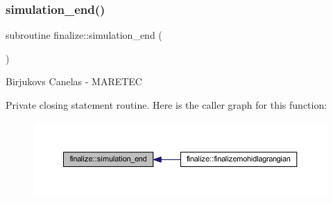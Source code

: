 \subsubsection{\texorpdfstring{simulation\+\_\+end()}{simulation\_end()}}
{\footnotesize\ttfamily subroutine finalize\+::simulation\+\_\+end (\begin{DoxyParamCaption}{ }\end{DoxyParamCaption})\hspace{0.3cm}{\ttfamily [private]}}



Birjukovs Canelas -\/ M\+A\+R\+E\+T\+EC 

Private closing statement routine. Here is the caller graph for this function\+:\nopagebreak
\begin{figure}[H]
\begin{center}
\leavevmode
\includegraphics[width=350pt]{namespacefinalize_a57fbc96712f416103b529ff969479250_icgraph}
\end{center}
\end{figure}
